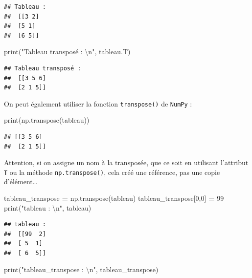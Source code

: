 \documentclass[12pt,]{book}
\newenvironment{Shaded}{\begin{snugshade}}{\end{snugshade}}
\newcommand{\DecValTok}[1]{\textcolor[rgb]{0.00,0.00,0.81}{#1}}
\newcommand{\CharTok}[1]{\textcolor[rgb]{0.31,0.60,0.02}{#1}}
\newcommand{\StringTok}[1]{\textcolor[rgb]{0.31,0.60,0.02}{#1}}
\newcommand{\OperatorTok}[1]{\textcolor[rgb]{0.81,0.36,0.00}{\textbf{#1}}}
\newcommand{\BuiltInTok}[1]{#1}
\newcommand{\NormalTok}[1]{#1}
\numberwithin{equation}{section}
\numberwithin{countremarque}{section}
\begin{document}
\begin{lstlisting}
## Tableau : 
##  [[3 2]
##  [5 1]
##  [6 5]]
\end{lstlisting}

\begin{Shaded}
\begin{Highlighting}[]
\BuiltInTok{print}\NormalTok{(}\StringTok{"Tableau transposé : }\CharTok{\textbackslash{}n}\StringTok{"}\NormalTok{, tableau.T)}
\end{Highlighting}
\end{Shaded}

\begin{lstlisting}
## Tableau transposé : 
##  [[3 5 6]
##  [2 1 5]]
\end{lstlisting}

On peut également utiliser la fonction \texttt{transpose()} de
\texttt{NumPy} :

\begin{Shaded}
\begin{Highlighting}[]
\BuiltInTok{print}\NormalTok{(np.transpose(tableau))}
\end{Highlighting}
\end{Shaded}

\begin{lstlisting}
## [[3 5 6]
##  [2 1 5]]
\end{lstlisting}

Attention, si on assigne un nom à la transposée, que ce soit en
utilisant l'attribut \texttt{T} ou la méthode \texttt{np.transpose()},
cela créé une référence, pas une copie d'élément\ldots{}

\begin{Shaded}
\begin{Highlighting}[]
\NormalTok{tableau_transpose }\OperatorTok{=}\NormalTok{ np.transpose(tableau)}
\NormalTok{tableau_transpose[}\DecValTok{0}\NormalTok{,}\DecValTok{0}\NormalTok{] }\OperatorTok{=} \DecValTok{99}
\BuiltInTok{print}\NormalTok{(}\StringTok{"tableau : }\CharTok{\textbackslash{}n}\StringTok{"}\NormalTok{, tableau)}
\end{Highlighting}
\end{Shaded}

\begin{lstlisting}
## tableau : 
##  [[99  2]
##  [ 5  1]
##  [ 6  5]]
\end{lstlisting}

\begin{Shaded}
\begin{Highlighting}[]
\BuiltInTok{print}\NormalTok{(}\StringTok{"tableau_transpose : }\CharTok{\textbackslash{}n}\StringTok{"}\NormalTok{, tableau_transpose)}
\end{Highlighting}
\end{Shaded}
\end{document}
